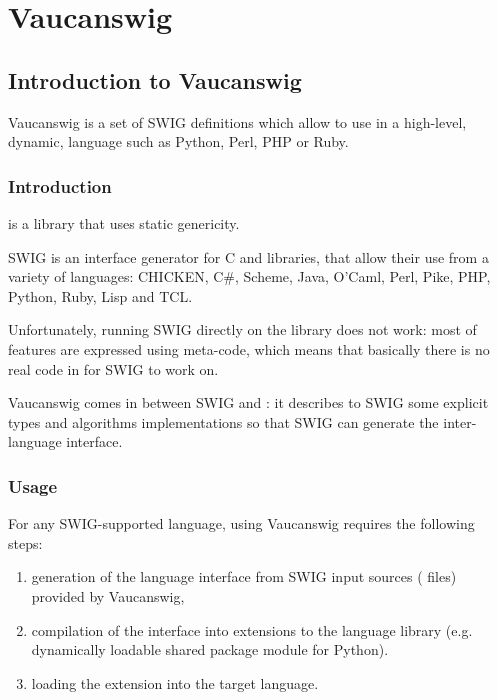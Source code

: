 \chapter{Vaucanswig}
\label{sec:swig}

\section{Introduction to Vaucanswig}

Vaucanswig is a set of SWIG definitions which allow to use \Vauc in a
high-level, dynamic, language such as Python, Perl, PHP or Ruby.

\subsection{Introduction}

\Vauc is a \Cxx library that uses static genericity.

SWIG is an interface generator for C and \Cxx libraries, that allow
their use from a variety of languages: CHICKEN, C#, Scheme, Java,
O'Caml, Perl, Pike, PHP, Python, Ruby, Lisp and TCL.

Unfortunately, running SWIG directly on the \Vauc library does not
work: most of \Vauc features are expressed using \Cxx meta-code,
which means that basically there is no real code in \Vauc for SWIG
to work on.

Vaucanswig comes in between SWIG and \Vauc: it describes to SWIG
some explicit \Vauc types and algorithms implementations so that
SWIG can generate the inter-language interface.

\subsection{Usage}

For  any  SWIG-supported   language,  using  Vaucanswig  requires  the
following steps:

\begin{enumerate}
\item generation of the language interface from SWIG input sources
  ( files) provided by Vaucanswig,

\item compilation of the interface into extensions to the language
  library (e.g.  dynamically loadable shared package module for
  Python).

\item loading the extension into the target language.
\end{enumerate}

